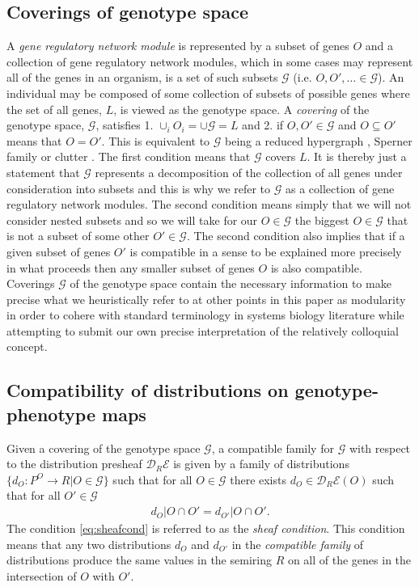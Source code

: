 \subsection{Coverings of genotype space}
A \emph{gene regulatory network module} is represented by a subset of genes $O$ and a collection of gene regulatory network modules, which in some cases may represent all of the genes in an organism, is a set of such subsets $\mathcal{G}$ (i.e. $O,O',\ldots \in \mathcal{G}$). An individual may be composed of some collection of subsets of possible genes where the set of all genes, $L$, is viewed as the genotype space. A \emph{covering} of the genotype space, $\mathcal{G}$, satisfies 1. $\cup_i O_i = \cup \mathcal{G} = L$ and 2. if $O,O' \in \mathcal{G}$ and $O \subseteq O'$ means that $O = O'$. This is equivalent to $\mathcal{G}$ being a reduced hypergraph , Sperner family or clutter \cite{Lauritzen1996}. The first condition means that $\mathcal{G}$ covers $L$. It is thereby just a statement that $\mathcal{G}$ represents a decomposition of the collection of all genes under consideration into subsets and this is why we refer to $\mathcal{G}$ as a collection of gene regulatory network modules. The second condition means simply that we will not consider nested subsets and so we will take for our $O \in \mathcal{G}$ the biggest $O \in \mathcal{G}$ that is not a subset of some other $O' \in \mathcal{G}$. The second condition also implies that if a given subset of genes $O'$ is compatible in a sense to be explained more precisely in what proceeds then any smaller subset of genes $O$ is also compatible. Coverings $\mathcal{G}$ of the genotype space contain the necessary information to make precise what we heuristically refer to at other points in this paper as modularity in order to cohere with standard terminology in systems biology literature while attempting to submit our own precise interpretation of the relatively colloquial concept.

\subsection{Compatibility of distributions on genotype-phenotype maps}
Given a covering of the genotype space $\mathcal{G}$, a compatible family for $\mathcal{G}$ with respect to the distribution presheaf $\mathcal{D}_R\mathcal{E}$ is given by a family of distributions $\{d_O \colon P^O \rightarrow R | O \in \mathcal{G}\}$ such that for all $O \in \mathcal{G}$ there exists $d_O \in \mathcal{D}_R\mathcal{E}(O)$ such that for all $O' \in \mathcal{G}$
\begin{eqnarray}\label{eq:sheafcond}
d_O|O \cap O' = d_{O'}|O \cap O'.
\end{eqnarray}
The condition \ref{eq:sheafcond} is referred to as the \emph{sheaf condition}. This condition means that any two distributions $d_O$ and $d_{O'}$ in the \emph{compatible family} of distributions produce the same values in the semiring $R$ on all of the genes in the intersection of $O$ with $O'$.

